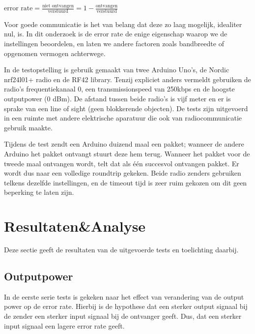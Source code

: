 \documentclass[a4paper,10pt]{article}
\begin{document}
\begin{math}
    \text{error rate} = \frac{\text{niet ontvangen}}{\text{verstuurd}} = 1 - \frac{\text{ontvangen}}{\text{verstuurd}} 
\end{math}

Voor goede communicatie is het van belang dat deze zo laag mogelijk, idealiter nul, is. In dit onderzoek is de error rate de enige eigenschap waarop we de instellingen beoordelen, en laten we andere factoren zoals bandbreedte of opgenomen vermogen achterwege.

In de testopstelling is gebruik gemaakt van twee Arduino Uno's, de Nordic nrf24l01+ radio en de RF42 library. Tenzij expliciet anders vermeldt gebruiken de radio's frequentiekanaal 0, een transmissionspeed van 250kbps en de hoogste outputpower (0 dBm). De afstand tussen beide radio's is vijf meter en er is sprake van een line of sight (geen blokkerende objecten). De tests zijn uitgevoerd in een ruimte met andere elektrische aparatuur die ook van radiocommunicatie gebruik maakte.

Tijdens de test zendt een Arduino duizend maal een pakket; wanneer de andere Arduino het pakket ontvangt stuurt deze hem terug. Wanneer het pakket voor de tweede maal ontvangen wordt, telt dat als \'e\'en succesvol ontvangen pakket. Er wordt dus naar een volledige roundtrip gekeken. Beide radio zenders gebruiken telkens dezelfde instellingen, en de timeout tijd is zeer ruim gekozen om dit geen beperking te laten zijn.

\section{Resultaten\&Analyse}
Deze sectie geeft de resultaten van de uitgevoerde tests en toelichting daarbij.

\subsection{Outputpower}
In de eerste serie tests is gekeken naar het effect van verandering van de output power op de error rate. Hierbij is de hypothese dat een sterker output signaal bij de zender een sterker input signaal bij de ontvanger geeft. Dus, dat een sterker input signaal een lagere error rate geeft.
\end{document}
